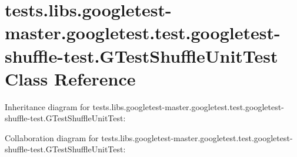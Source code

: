 \hypertarget{classtests_1_1libs_1_1googletest-master_1_1googletest_1_1test_1_1googletest-shuffle-test_1_1GTestShuffleUnitTest}{}\section{tests.\+libs.\+googletest-\/master.googletest.\+test.\+googletest-\/shuffle-\/test.G\+Test\+Shuffle\+Unit\+Test Class Reference}
\label{classtests_1_1libs_1_1googletest-master_1_1googletest_1_1test_1_1googletest-shuffle-test_1_1GTestShuffleUnitTest}


Inheritance diagram for tests.\+libs.\+googletest-\/master.googletest.\+test.\+googletest-\/shuffle-\/test.G\+Test\+Shuffle\+Unit\+Test\+:


Collaboration diagram for tests.\+libs.\+googletest-\/master.googletest.\+test.\+googletest-\/shuffle-\/test.G\+Test\+Shuffle\+Unit\+Test\+:
